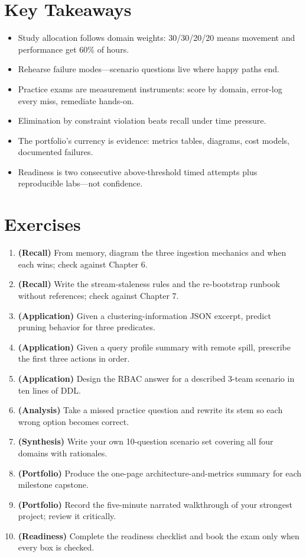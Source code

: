 \section*{Key Takeaways}
\begin{itemize}
    \item Study allocation follows domain weights: 30/30/20/20 means movement and performance get 60\% of hours.
    \item Rehearse failure modes---scenario questions live where happy paths end.
    \item Practice exams are measurement instruments: score by domain, error-log every miss, remediate hands-on.
    \item Elimination by constraint violation beats recall under time pressure.
    \item The portfolio's currency is evidence: metrics tables, diagrams, cost models, documented failures.
    \item Readiness is two consecutive above-threshold timed attempts plus reproducible labs---not confidence.
\end{itemize}

\section{Exercises}
\begin{enumerate}
    \item \textbf{(Recall)} From memory, diagram the three ingestion mechanics and when each wins; check against Chapter 6.
    \item \textbf{(Recall)} Write the stream-staleness rules and the re-bootstrap runbook without references; check against Chapter 7.
    \item \textbf{(Application)} Given a clustering-information JSON excerpt, predict pruning behavior for three predicates.
    \item \textbf{(Application)} Given a query profile summary with remote spill, prescribe the first three actions in order.
    \item \textbf{(Application)} Design the RBAC answer for a described 3-team scenario in ten lines of DDL.
    \item \textbf{(Analysis)} Take a missed practice question and rewrite its stem so each wrong option becomes correct.
    \item \textbf{(Synthesis)} Write your own 10-question scenario set covering all four domains with rationales.
    \item \textbf{(Portfolio)} Produce the one-page architecture-and-metrics summary for each milestone capstone.
    \item \textbf{(Portfolio)} Record the five-minute narrated walkthrough of your strongest project; review it critically.
    \item \textbf{(Readiness)} Complete the readiness checklist and book the exam only when every box is checked.
\end{enumerate}

